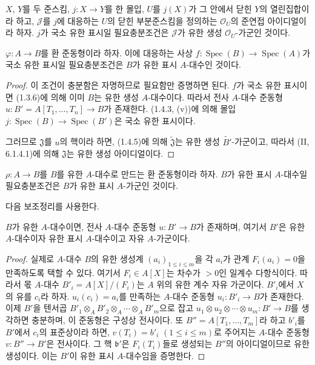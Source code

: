 \begin{corollary}[1.4.5]
\label{IV.1.4.5-fr}
$X$, $Y$를 두 준스킴, $j:X\to Y$를 한 몰입, $U$를 $j(X)$가
그 안에서 닫힌 $Y$의 열린집합이라 하고, $\mathcal J$를 $j$에
대응하는 $U$의 닫힌 부분준스킴을 정의하는 $\mathcal O_U$의
준연접 아이디얼이라 하자. $j$가 국소 유한 표시일 필요충분조건은
$\mathcal J$가 유한 생성 $\mathcal O_U$-가군인 것이다.
\end{corollary}

\par\medskip\noindent
\begin{proposition}[1.4.6]
\label{IV.1.4.6-fr}
$\varphi:A\to B$를 환 준동형이라 하자. 이에 대응하는 사상
$f:\operatorname{Spec}(B)\to\operatorname{Spec}(A)$가 국소 유한
표시일 필요충분조건은 $B$가 유한 표시 $A$-대수인 것이다.
\end{proposition}

\begin{proof}
이 조건이 충분함은 자명하므로 필요함만 증명하면 된다. $f$가 국소
유한 표시이면 (1.3.6)에 의해 이미 $B$는 유한 생성 $A$-대수이다.
따라서 전사 $A$-대수 준동형
$u:B'=A[T_1,\ldots,T_n]\to B$가 존재한다. (1.4.3, (v))에 의해
몰입 $j:\operatorname{Spec}(B)\to\operatorname{Spec}(B')$은 국소
유한 표시이다.


그러므로 $\mathfrak J$를 $u$의 핵이라 하면, (1.4.5)에 의해
$\widetilde{\mathfrak J}$는 유한 생성 $\widetilde{B'}$-가군이고,
따라서 (II, 6.1.4.1)에 의해 $\mathfrak J$는 유한 생성 아이디얼이다.
\end{proof}

\begin{proposition}[1.4.7]
\label{IV.1.4.7-fr}
$\rho:A\to B$를 $B$를 유한 $A$-대수로 만드는 환 준동형이라 하자.
$B$가 유한 표시 $A$-대수일 필요충분조건은 $B$가 유한 표시
$A$-가군인 것이다.
\end{proposition}

다음 보조정리를 사용한다.

\begin{lemma}[1.4.7.1]
\label{IV.1.4.7.1-fr}
$B$가 유한 $A$-대수이면, 전사 $A$-대수 준동형 $u:B'\to B$가
존재하며, 여기서 $B'$은 유한 $A$-대수이자 유한 표시 $A$-대수이고
자유 $A$-가군이다.
\end{lemma}

\begin{proof}
실제로 $A$-대수 $B$의 유한 생성계 $(a_i)_{1\leq i\leq m}$을 각
$a_i$가 관계 $F_i(a_i)=0$을 만족하도록 택할 수 있다. 여기서
$F_i\in A[X]$는 차수가 $>0$인 일계수 다항식이다. 따라서 몫
$A$-대수 $B'_i=A[X]/(F_i)$는 $A$ 위의 유한 계수 자유 가군이다.
$B'_i$에서 $X$의 유를 $c_i$라 하자. $u_i(c_i)=a_i$를 만족하는
$A$-대수 준동형 $u_i:B'_i\to B$가 존재한다. 이제
$B'$을 텐서곱
$B'_1\otimes_AB'_2\otimes_A\cdots\otimes_AB'_m$으로 잡고
$u_1\otimes u_2\otimes\cdots\otimes u_m:B'\to B$를 생각하면 충분하며,
이 준동형은 구성상 전사이다. 또 $B''=A[T_1,\ldots,T_m]$라 하고
$b'_i$를 $B'$에서 $c_i$의 표준상이라 하면, $v(T_i)=b'_i$
$(1\leq i\leq m)$로 주어지는 $A$-대수 준동형 $v:B''\to B'$은
전사이다. 그 핵 $\mathfrak b'$은 $F_i(T_i)$들로 생성되는 $B''$의
아이디얼이므로 유한 생성이다. 이는 $B'$이 유한 표시
$A$-대수임을 증명한다.
\end{proof}

